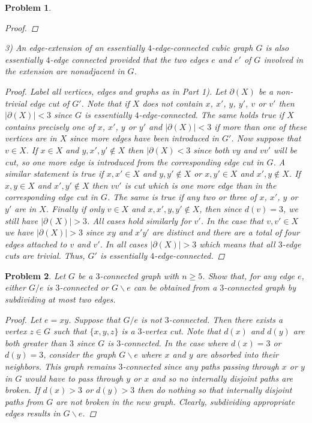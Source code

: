 \documentclass{article}
\newtheorem{problem}{Problem}
\begin{document}
\begin{problem}
\begin{proof}
\end{proof}
3) An edge-extension of an essentially $4$-edge-connected cubic graph $G$ is also essentially $4$-edge connected provided that the two edges $e$ and $e'$ of $G$ involved in the extension are nonadjacent in $G$.
\begin{proof}
Label all vertices, edges and graphs as in Part 1). Let $\partial(X)$ be a non-trivial edge cut of $G'$. Note that if $X$ does not contain $x$, $x'$, $y$, $y'$, $v$ or $v'$ then $|\partial(X)| < 3$ since $G$ is essentially $4$-edge-connected. The same holds true if $X$ contains precisely one of $x$, $x'$, $y$ or $y'$ and $|\partial(X)| < 3$ if more than one of these vertices are in $X$ since more edges have been introduced in $G'$. Now suppose that $v \in X$. If $x \in X$ and $y, x', y' \notin X$ then $|\partial(X) < 3$ since both $vy$ and $vv'$ will be cut, so one more edge is introduced from the corresponding edge cut in $G$. A similar statement is true if $x, x' \in X$ and $y, y' \notin X$ or $x, y' \in X$ and $x', y \notin X$. If $x, y \in X$ and $x', y' \notin X$ then $vv'$ is cut which is one more edge than in the corresponding edge cut in $G$. The same is true if any two or three of $x$, $x'$, $y$ or $y'$ are in $X$. Finally if only $v \in X$ and $x,x',y,y' \notin X$, then since $d(v) = 3$, we still have $|\partial(X)| > 3$. All cases hold similarly for $v'$. In the case that $v,v' \in X$ we have $|\partial(X)| > 3$ since $xy$ and $x'y'$ are distinct and there are a total of four edges attached to $v$ and $v'$. In all cases $|\partial(X)| > 3$ which means that all $3$-edge cuts are trivial. Thus, $G'$ is essentially $4$-edge-connected.
\end{proof}
\end{problem}

\begin{problem}
Let $G$ be a $3$-connected graph with $n \geq 5$. Show that, for any edge $e$, either $G / e$ is $3$-connected or $G \backslash e$ can be obtained from a $3$-connected graph by subdividing at most two edges.
\begin{proof}
Let $e = xy$. Suppose that $G / e$ is not $3$-connected. Then there exists a vertex $z \in G$ such that $\{x, y, z\}$ is a $3$-vertex cut. Note that $d(x)$ and $d(y)$ are both greater than $3$ since $G$ is $3$-connected. In the case where $d(x) = 3$ or $d(y) = 3$, consider the graph $G \backslash e$ where $x$ and $y$ are absorbed into their neighbors. This graph remains $3$-connected since any paths passing through $x$ or $y$ in $G$ would have to pass through $y$ or $x$ and so no internally disjoint paths are broken. If $d(x) > 3$ or $d(y) > 3$ then do nothing so that internally disjoint paths from $G$ are not broken in the new graph. Clearly, subdividing appropriate edges results in $G \backslash e$.
\end{proof}
\end{problem}
\end{document}
